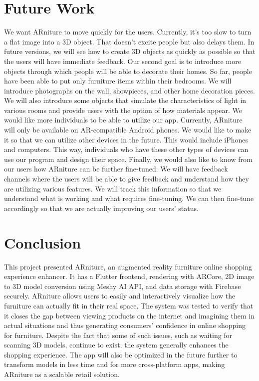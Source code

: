 \documentclass[12pt, a4paper]{article}
\begin{document}
\section{Future Work}
We want ARniture to move quickly for the users. Currently, it's too slow to turn a flat image into a 3D object. That doesn't excite people but also delays them. In future versions, we will see how to create 3D objects as quickly as possible so that the users will have immediate feedback. Our second goal is to introduce more objects through which people will be able to decorate their homes. So far, people have been able to put only furniture items within their bedrooms. We will introduce photographs on the wall, showpieces, and other home decoration pieces. We will also introduce some objects that simulate the characteristics of light in various rooms and provide users with the option of how materials appear. We would like more individuals to be able to utilize our app. Currently, ARniture will only be available on AR-compatible Android phones. We would like to make it so that we can utilize other devices in the future. This would include iPhones and computers. This way, individuals who have these other types of devices can use our program and design their space. Finally, we would also like to know from our users how ARniture can be further fine-tuned. We will have feedback channels where the users will be able to give feedback and understand how they are utilizing various features. We will track this information so that we understand what is working and what requires fine-tuning. We can then fine-tune accordingly so that we are actually improving our users' status.

\section{Conclusion}
This project presented ARniture, an augmented reality furniture online shopping experience enhancer. It has a Flutter frontend, rendering with ARCore, 2D image to 3D model conversion using Meshy AI API, and data storage with Firebase securely. ARniture allows users to easily and interactively visualize how the furniture can actually fit in their real space. The system was tested to verify that it closes the gap between viewing products on the internet and imagining them in actual situations and thus generating consumers' confidence in online shopping for furniture. Despite the fact that some of such issues, such as waiting for scanning 3D models, continue to exist, the system generally enhances the shopping experience. The app will also be optimized in the future further to transform models in less time and for more cross-platform apps, making ARniture as a scalable retail solution.
\end{document}
